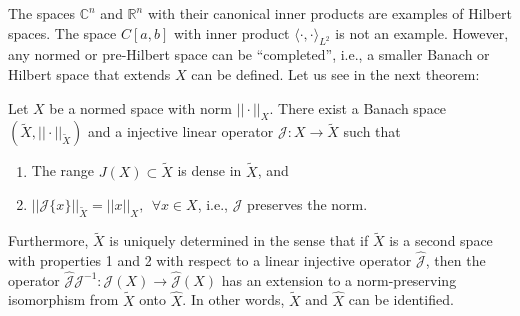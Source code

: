 			The spaces $\mathbb{C}^n$ and $\mathbb{R}^n$ with their canonical inner products are examples of Hilbert spaces. The space $C[a,b]$  with inner product $\langle\cdot,\cdot\rangle_{L^2}$ is not an example. However, any normed or pre-Hilbert space can be ``completed'', i.e., a smaller Banach or Hilbert space that extends $X$ can be defined. Let us see in the next theorem:
			\begin{theorem}\label{the:app:functional:4}
				Let $X$ be a normed space with norm $||\cdot||_X$. There exist a Banach space $(\tilde{X},||\cdot||_{\tilde{X}})$ and a injective linear operator $\mathcal{J}:X\rightarrow\tilde{X}$ such that
				\begin{enumerate}
					\item The range $J(X)\subset\tilde{X}$ is dense in $\tilde{X}$, and
					\item $||\mathcal{J}\{x\}||_{\tilde{X}} = ||x||_{X},~~\forall x\in X$, i.e., $\mathcal{J}$ preserves the norm.
				\end{enumerate}
				Furthermore, $\tilde{X}$ is uniquely determined in the sense that if $\tilde{X}$ is a second space with properties 1 and 2 with respect to a linear injective operator $\mathcal{\hat{J}}$, then the operator $\mathcal{\hat{J}}\mathcal{J}^{-1} : \mathcal{J}(X)\rightarrow\mathcal{\hat{J}}(X)$ has an extension to a norm-preserving isomorphism from $\tilde{X}$ onto $\hat{X}$. In other words, $\tilde{X}$ and $\hat{X}$ can be identified. 
			\end{theorem}
		

